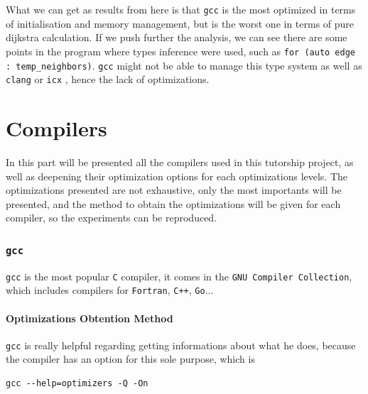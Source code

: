 \documentclass{rapport}
\newcommand{\gcc}{\texttt{gcc} }
\newcommand{\icx}{\texttt{icx} }
\newcommand{\clang}{\texttt{clang} }
\begin{document}
What we can get as results from here is that \gcc is the most optimized in terms of initialisation and memory management, but is the worst one in terms 
of pure dijkstra calculation. \newline
If we push further the analysis, we can see there are some points in the program where types inference were used, such as \texttt{for (auto edge : temp\_neighbors)}. 
\gcc might not be able to manage this type system as well as \clang or \icx, hence the lack of optimizations.

\clearpage
\part{Compilers}
In this part will be presented all the compilers used in this tutorship project, as well as deepening their optimization options for each optimizations levels.
\newline
The optimizations presented are not exhaustive, only the most importants will be presented, and the method to obtain the optimizations will be given
for each compiler, so the experiments can be reproduced.




\section{\gcc}
\gcc is the most popular \texttt{C} compiler, it comes in the \texttt{GNU Compiler Collection}, which includes compilers for \texttt{Fortran}, \texttt{C++}, \texttt{Go}...

\subsection*{Optimizations Obtention Method}
\gcc is really helpful regarding getting informations about what he does, because the compiler has an option for this sole purpose, which is
\begin{verbatim}
gcc --help=optimizers -Q -On
\end{verbatim}
\end{document}
